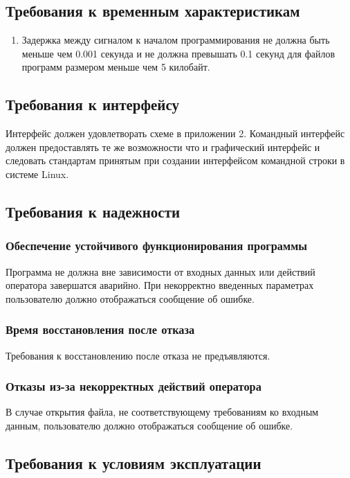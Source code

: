 \subsection{Требования к временным характеристикам}
\begin{enumerate}
\item Задержка между сигналом к началом программирования не должна быть меньше чем 0.001 секунда и не должна превышать 0.1 секунд для файлов программ размером меньше чем 5 килобайт.
\end{enumerate}


\subsection{Требования к интерфейсу}
Интерфейс должен удовлетворать схеме в приложении 2. Командный интерфейс должен предоставлять те же возможности что и графический интерфейс и следовать стандартам принятым при создании интерфейсом командной строки в системе Linux.

\subsection{Требования к надежности}
\subsubsection{Обеспечение устойчивого функционирования программы}
Программа не должна вне зависимости от входных данных или действий оператора завершатся аварийно. При некорректно введенных параметрах пользователю должно отображаться сообщение об ошибке.
\subsubsection{Время восстановления после отказа}
Требования к восстановлению после отказа не предъявляются.
\subsubsection{Отказы из-за некорректных действий оператора}
В случае открытия файла, не соответствующему требованиям ко входным данным, пользователю должно отображаться сообщение об ошибке.

\subsection{Требования к условиям эксплуатации}
